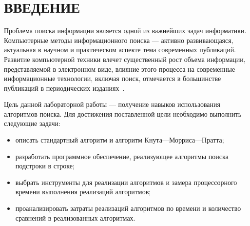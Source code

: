 \chapter*{ВВЕДЕНИЕ}

Проблема поиска информации является одной из важнейших задач информатики.
Компьютерные методы информационного поиска --- активно развивающаяся, актуальная в научном и практическом аспекте тема современных публикаций. 
Развитие компьютерной техники влечет существенный рост объема информации, представляемой в электронном виде, влияние этого процесса на современные информационные технологии, включая поиск, отмечается в большинстве публикаций в периодических изданиях~\cite{intro}.



Цель данной лабораторной работы --- получение навыков использования алгоритмов поиска.
Для достижения поставленной цели необходимо выполнить следующие задачи:
\begin{itemize}
	\item описать стандартный алгоритм и алгоритм Кнута---Морриса---Пратта;
	\item разработать программное обеспечение, реализующее алгоритмы поиска подстроки в строке;
	\item выбрать инструменты для реализации алгоритмов и замера процессорного времени выполнения реализаций алгоритмов;
	\item проанализировать затраты реализаций алгоритмов по времени и количество сравнений в реализованных алгоритмах.
\end{itemize}
